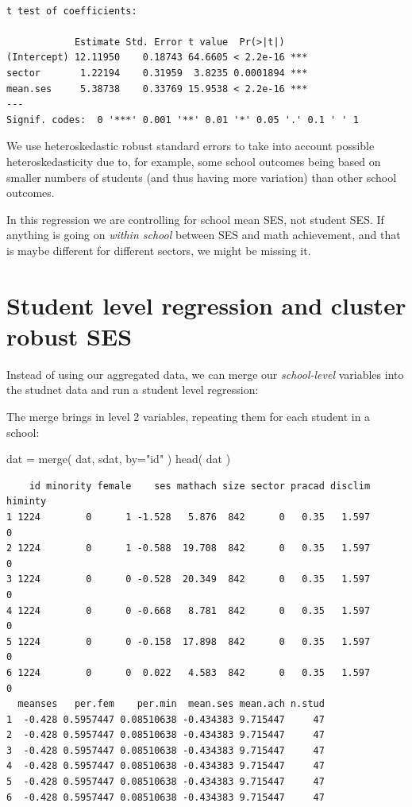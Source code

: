 \documentclass[
  letterpaper,
  DIV=11,
  numbers=noendperiod]{scrreprt}
\newenvironment{Shaded}{\begin{snugshade}}{\end{snugshade}}
\newcommand{\AttributeTok}[1]{\textcolor[rgb]{0.49,0.56,0.16}{#1}}
\newcommand{\FunctionTok}[1]{\textcolor[rgb]{0.02,0.16,0.49}{#1}}
\newcommand{\NormalTok}[1]{\textcolor[rgb]{0.00,0.44,0.13}{#1}}
\newcommand{\OtherTok}[1]{\textcolor[rgb]{0.00,0.44,0.13}{#1}}
\newcommand{\StringTok}[1]{\textcolor[rgb]{0.25,0.44,0.63}{#1}}
\begin{document}
\begin{verbatim}

t test of coefficients:

            Estimate Std. Error t value  Pr(>|t|)    
(Intercept) 12.11950    0.18743 64.6605 < 2.2e-16 ***
sector       1.22194    0.31959  3.8235 0.0001894 ***
mean.ses     5.38738    0.33769 15.9538 < 2.2e-16 ***
---
Signif. codes:  0 '***' 0.001 '**' 0.01 '*' 0.05 '.' 0.1 ' ' 1
\end{verbatim}

We use heteroskedastic robust standard errors to take into account
possible heteroskedasticity due to, for example, some school outcomes
being based on smaller numbers of students (and thus having more
variation) than other school outcomes.

In this regression we are controlling for school mean SES, not student
SES. If anything is going on \emph{within school} between SES and math
achievement, and that is maybe different for different sectors, we might
be missing it.

\hypertarget{student-level-regression-and-cluster-robust-ses}{%
\section{Student level regression and cluster robust
SES}\label{student-level-regression-and-cluster-robust-ses}}

Instead of using our aggregated data, we can merge our
\emph{school-level} variables into the studnet data and run a student
level regression:

The merge brings in level 2 variables, repeating them for each student
in a school:

\begin{Shaded}
\begin{Highlighting}[]
\NormalTok{dat }\OtherTok{=} \FunctionTok{merge}\NormalTok{( dat, sdat, }\AttributeTok{by=}\StringTok{"id"}\NormalTok{ )}
\FunctionTok{head}\NormalTok{( dat )}
\end{Highlighting}
\end{Shaded}

\begin{verbatim}
    id minority female    ses mathach size sector pracad disclim himinty
1 1224        0      1 -1.528   5.876  842      0   0.35   1.597       0
2 1224        0      1 -0.588  19.708  842      0   0.35   1.597       0
3 1224        0      0 -0.528  20.349  842      0   0.35   1.597       0
4 1224        0      0 -0.668   8.781  842      0   0.35   1.597       0
5 1224        0      0 -0.158  17.898  842      0   0.35   1.597       0
6 1224        0      0  0.022   4.583  842      0   0.35   1.597       0
  meanses   per.fem    per.min  mean.ses mean.ach n.stud
1  -0.428 0.5957447 0.08510638 -0.434383 9.715447     47
2  -0.428 0.5957447 0.08510638 -0.434383 9.715447     47
3  -0.428 0.5957447 0.08510638 -0.434383 9.715447     47
4  -0.428 0.5957447 0.08510638 -0.434383 9.715447     47
5  -0.428 0.5957447 0.08510638 -0.434383 9.715447     47
6  -0.428 0.5957447 0.08510638 -0.434383 9.715447     47
\end{verbatim}
\end{document}
